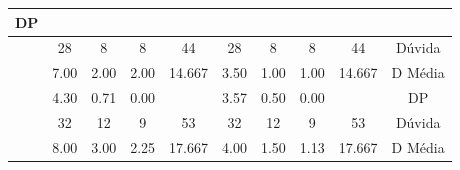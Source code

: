 \begin{table}[htbp]
\begin{tabular}{|cccccccccc}
		\multicolumn{1}{c|}{DP} \\ \hline
		\rowcolor[HTML]{D9D9D9} 
		\multicolumn{1}{|c|}{\cellcolor[HTML]{F2F2F2}} &
		\multicolumn{1}{c|}{\cellcolor[HTML]{D9D9D9}28} &
		\multicolumn{1}{c|}{\cellcolor[HTML]{D9D9D9}8} &
		\multicolumn{1}{c|}{\cellcolor[HTML]{D9D9D9}8} &
		\multicolumn{1}{c|}{\cellcolor[HTML]{D9D9D9}44} &
		\multicolumn{1}{c|}{\cellcolor[HTML]{D9D9D9}28} &
		\multicolumn{1}{c|}{\cellcolor[HTML]{D9D9D9}8} &
		\multicolumn{1}{c|}{\cellcolor[HTML]{D9D9D9}8} &
		\multicolumn{1}{c|}{\cellcolor[HTML]{D9D9D9}44} &
		\multicolumn{1}{c|}{\cellcolor[HTML]{D9D9D9}Dúvida} \\ \cline{2-10} 
		\multicolumn{1}{|c|}{\cellcolor[HTML]{F2F2F2}} &
		\multicolumn{1}{c|}{7.00} &
		\multicolumn{1}{c|}{2.00} &
		\multicolumn{1}{c|}{2.00} &
		\multicolumn{1}{c|}{14.667} &
		\multicolumn{1}{c|}{3.50} &
		\multicolumn{1}{c|}{1.00} &
		\multicolumn{1}{c|}{1.00} &
		\multicolumn{1}{c|}{14.667} &
		\multicolumn{1}{c|}{D Média} \\ \cline{2-10} 
		\rowcolor[HTML]{D9D9D9} 
		\multicolumn{1}{|c|}{\multirow{-3}{*}{\cellcolor[HTML]{F2F2F2}\textbf{B03}}} &
		\multicolumn{1}{c|}{\cellcolor[HTML]{D9D9D9}4.30} &
		\multicolumn{1}{c|}{\cellcolor[HTML]{D9D9D9}0.71} &
		\multicolumn{1}{c|}{\cellcolor[HTML]{D9D9D9}0.00} &
		\multicolumn{1}{c|}{\cellcolor[HTML]{D9D9D9}} &
		\multicolumn{1}{c|}{\cellcolor[HTML]{D9D9D9}3.57} &
		\multicolumn{1}{c|}{\cellcolor[HTML]{D9D9D9}0.50} &
		\multicolumn{1}{c|}{\cellcolor[HTML]{D9D9D9}0.00} &
		\multicolumn{1}{c|}{\cellcolor[HTML]{D9D9D9}} &
		\multicolumn{1}{c|}{\cellcolor[HTML]{D9D9D9}DP} \\ \hline
		\multicolumn{1}{|c|}{\cellcolor[HTML]{F2F2F2}} &
		\multicolumn{1}{c|}{32} &
		\multicolumn{1}{c|}{12} &
		\multicolumn{1}{c|}{9} &
		\multicolumn{1}{c|}{53} &
		\multicolumn{1}{c|}{32} &
		\multicolumn{1}{c|}{12} &
		\multicolumn{1}{c|}{9} &
		\multicolumn{1}{c|}{53} &
		\multicolumn{1}{c|}{Dúvida} \\ \cline{2-10} 
		\rowcolor[HTML]{D9D9D9} 
		\multicolumn{1}{|c|}{\cellcolor[HTML]{F2F2F2}} &
		\multicolumn{1}{c|}{\cellcolor[HTML]{D9D9D9}8.00} &
		\multicolumn{1}{c|}{\cellcolor[HTML]{D9D9D9}3.00} &
		\multicolumn{1}{c|}{\cellcolor[HTML]{D9D9D9}2.25} &
		\multicolumn{1}{c|}{\cellcolor[HTML]{D9D9D9}17.667} &
		\multicolumn{1}{c|}{\cellcolor[HTML]{D9D9D9}4.00} &
		\multicolumn{1}{c|}{\cellcolor[HTML]{D9D9D9}1.50} &
		\multicolumn{1}{c|}{\cellcolor[HTML]{D9D9D9}1.13} &
		\multicolumn{1}{c|}{\cellcolor[HTML]{D9D9D9}17.667} &
		\multicolumn{1}{c|}{\cellcolor[HTML]{D9D9D9}D Média} \\ \cline{2-10} 

\end{tabular}
\end{table}
